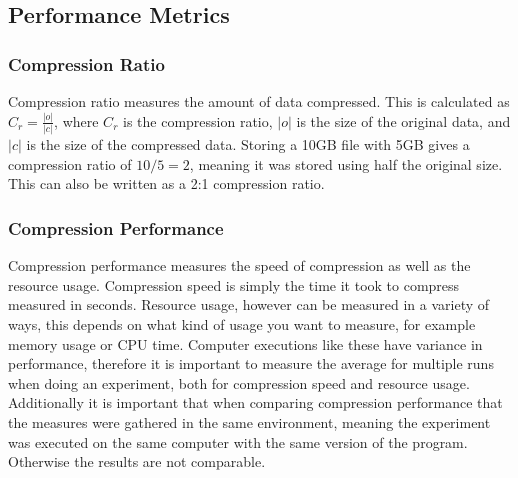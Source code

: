 \subsection{Performance Metrics}
\subsubsection{Compression Ratio}
Compression ratio measures the amount of data compressed. This is calculated as $C_{r} = \frac{|o|}{|c|}$, where $C_{r}$ is the compression ratio, $|o|$ is the size of the original data, and $|c|$ is the size of the compressed data. Storing a 10GB file with 5GB gives a compression ratio of $10 / 5 = 2$, meaning it was stored using half the original size. This can also be written as a 2:1 compression ratio.

\subsubsection{Compression Performance}
Compression performance measures the speed of compression as well as the resource usage. Compression speed is simply the time it took to compress measured in seconds. Resource usage, however can be measured in a variety of ways, this depends on what kind of usage you want to measure, for example memory usage or CPU time. Computer executions like these have variance in performance, therefore it is important to measure the average for multiple runs when doing an experiment, both for compression speed and resource usage. Additionally it is important that when comparing compression performance that the measures were gathered in the same environment, meaning the experiment was executed on the same computer with the same version of the program. Otherwise the results are not comparable.